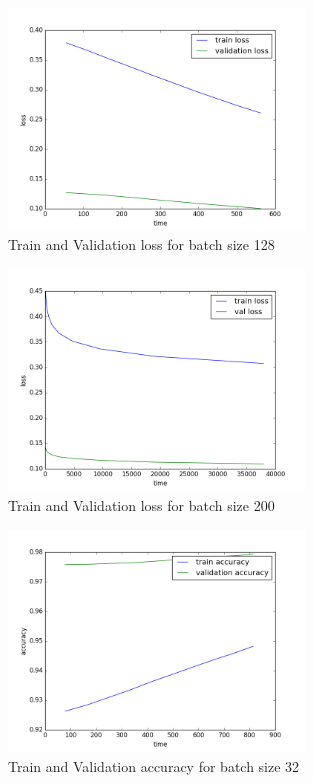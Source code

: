 \documentclass{article}
\begin{document}
\begin{figure}[h]
  \centering
  \includegraphics[width=0.7\textwidth]{keras_lenet/loss128.png}
  \caption{Train and Validation loss for batch size 128}
\end{figure}

\begin{figure}[h]
  \centering
  \includegraphics[width=0.7\textwidth]{keras_lenet/loss200.png}
  \caption{Train and Validation loss for batch size 200}
\end{figure}

\begin{figure}[h]
  \centering
  \includegraphics[width=0.7\textwidth]{keras_lenet/accuracy32.png}
  \caption{Train and Validation accuracy for batch size 32}
\end{figure}
\end{document}
